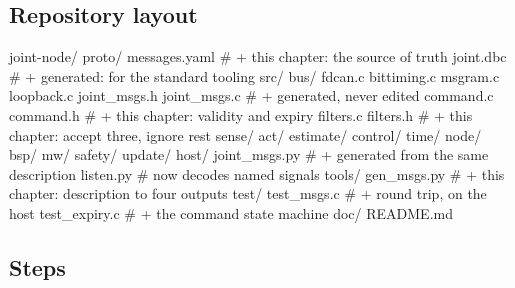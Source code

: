 \subsection*{Repository layout}

\begin{plaincode}
joint-node/
  proto/
    messages.yaml                   # + this chapter: the source of truth
    joint.dbc                       # + generated: for the standard tooling
  src/
    bus/
      fdcan.c bittiming.c msgram.c loopback.c
      joint_msgs.h  joint_msgs.c    # + generated, never edited
      command.c     command.h       # + this chapter: validity and expiry
      filters.c     filters.h       # + this chapter: accept three, ignore rest
    sense/ act/ estimate/ control/ time/ node/ bsp/
    mw/  safety/  update/
  host/
    joint_msgs.py                   # + generated from the same description
    listen.py                       # now decodes named signals
  tools/
    gen_msgs.py                     # + this chapter: description to four outputs
  test/
    test_msgs.c                     # + round trip, on the host
    test_expiry.c                   # + the command state machine
  doc/  README.md
\end{plaincode}

\subsection*{Steps}


